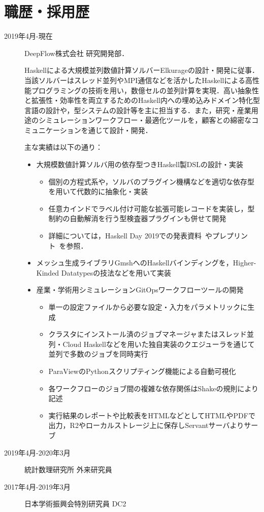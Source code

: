 \documentclass[a4j,draft]{ltjsarticle}
\begin{document}
\section*{職歴・採用歴}
\begin{refsection}
  \newrefcontext[labelprefix={J-}] 
\begin{description}
 \item[2019年4月-現在] DeepFlow株式会社 研究開発部．
 
  Haskellによる大規模並列数値計算ソルバーElkurageの設計・開発に従事．当該ソルバーはスレッド並列やMPI通信などを活かしたHaskellによる高性能プログラミングの技術を用い，数億セルの並列計算を実現．高い抽象性と拡張性・効率性を両立するためのHaskell内への埋め込みドメイン特化型言語の設計や，型システムの設計等を主に担当する．また，研究・産業用途のシミュレーションワークフロー・最適化ツールを，顧客との綿密なコミュニケーションを通じて設計・開発．

  主な実績は以下の通り：
  \begin{itemize}
    \item 大規模数値計算ソルバ用の依存型つきHaskell製DSLの設計・実装
    \begin{itemize}
      \item 個別の方程式系や，ソルバのプラグイン機構などを適切な依存型を用いて代数的に抽象化・実装
      \item 任意カインドでラベル付け可能な拡張可能レコードを実装し，型制約の自動解消を行う型検査器プラグインも併せて開発
      \item 詳細については，Haskell Day 2019での発表資料~\cite{ISHII:2019hd-ja}やプレプリント~\cite{ISHII:2021wt}を参照．
    \end{itemize}
    \item メッシュ生成ライブラリGmshへのHaskellバインディングを，Higher-Kinded Datatypesの技法などを用いて実装
    \item 産業・学術用シミュレーションGitOpsワークフローツールの開発
      \begin{itemize}
      \item 単一の設定ファイルから必要な設定・入力をパラメトリックに生成
      \item クラスタにインストール済のジョブマネージャまたはスレッド並列・Cloud Haskellなどを用いた独自実装のクエジューラを通じて並列で多数のジョブを同時実行
      \item ParaViewのPythonスクリプティング機能による自動可視化
      \item 各ワークフローのジョブ間の複雑な依存関係はShakeの規則により記述
      \item 実行結果のレポートや比較表をHTMLなどとしてHTMLやPDFで出力，R2やローカルストレージ上に保存しServantサーバよりサーブ
      \end{itemize}
  \end{itemize}
 \item[2019年4月-2020年3月] 統計数理研究所 外来研究員
 \item[2017年4月-2019年3月]
              日本学術振興会特別研究員 DC2


\end{description}
\end{refsection}
\end{document}
